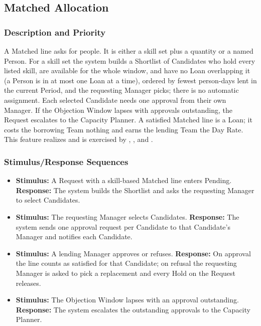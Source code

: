 \subsection{Matched Allocation}\label{feat:matched}

\subsubsection{Description and Priority}
A Matched line asks for people. It is either a skill set plus a quantity or a named Person. For a skill set the system builds a Shortlist of Candidates who hold every listed skill, are available for the whole window, and have no Loan overlapping it (a Person is in at most one Loan at a time), ordered by fewest person-days lent in the current Period, and the requesting Manager picks; there is no automatic assignment. Each selected Candidate needs one approval from their own Manager. If the Objection Window lapses with approvals outstanding, the Request escalates to the Capacity Planner. A satisfied Matched line is a Loan; it costs the borrowing Team nothing and earns the lending Team the Day Rate. This feature realizes  and is exercised by , , and . 

\subsubsection{Stimulus/Response Sequences}
\begin{itemize}
  \item \textbf{Stimulus:} A Request with a skill-based Matched line enters Pending. \textbf{Response:} The system builds the Shortlist and asks the requesting Manager to select Candidates.
  \item \textbf{Stimulus:} The requesting Manager selects Candidates. \textbf{Response:} The system sends one approval request per Candidate to that Candidate's Manager and notifies each Candidate.
  \item \textbf{Stimulus:} A lending Manager approves or refuses. \textbf{Response:} On approval the line counts as satisfied for that Candidate; on refusal the requesting Manager is asked to pick a replacement and every Hold on the Request releases.
  \item \textbf{Stimulus:} The Objection Window lapses with an approval outstanding. \textbf{Response:} The system escalates the outstanding approvals to the Capacity Planner.
\end{itemize}

